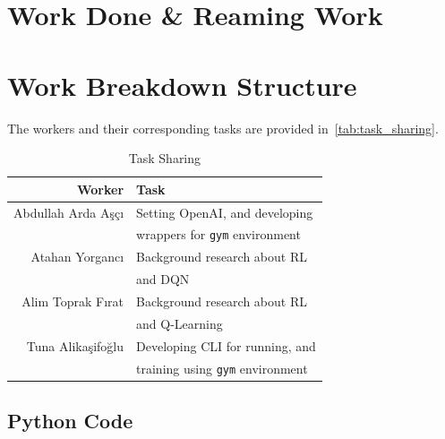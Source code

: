 \documentclass[a4paper, 12pt, conference]{IEEEtran}
\begin{document}
\section{Work Done \& Reaming Work}


\section{Work Breakdown Structure}
The workers and their corresponding tasks are provided in~\autoref{tab:task_sharing}.

\begin{table}[h]
    \centering
    \caption{Task Sharing}\label{tab:task_sharing}
    \begin{tabular}{rl}\toprule
        \textbf{Worker}    & \textbf{Task}                           \\\midrule
        Abdullah Arda Aşçı & Setting OpenAI, and developing          \\
                           & wrappers for \texttt{gym} environment   \\
        Atahan Yorgancı    & Background research about RL            \\
                           & and DQN                                 \\
        Alim Toprak Fırat  & Background research about RL            \\
                           & and Q-Learning                          \\
        Tuna Alikaşifoğlu  & Developing CLI for running, and         \\
                           & training using \texttt{gym} environment \\ \bottomrule
    \end{tabular}
\end{table}

\newpage
\printbibliography{}

\begin{appendices}
    \onecolumn
    \section{Python Code}
    \inputminted[linenos]{python}{../src/main.py}
\end{appendices}
\end{document}
